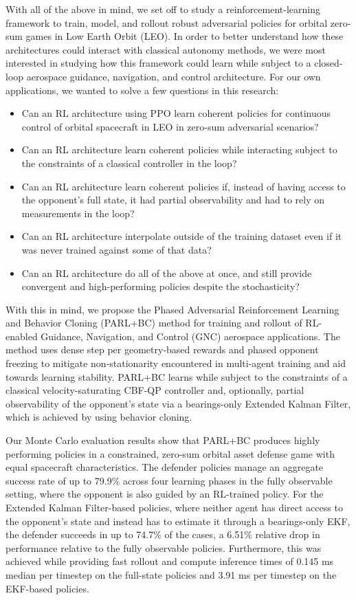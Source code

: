 With all of the above in mind, we set off to study a reinforcement-learning framework to train, model, and rollout robust adversarial policies for orbital zero-sum games in Low Earth Orbit (LEO). In order to better understand how these architectures could interact with classical autonomy methods, we were most interested in studying how this framework could learn while subject to a closed-loop aerospace guidance, navigation, and control architecture. For our own applications, we wanted to solve a few questions in this research:

\begin{itemize}
    \item Can an RL architecture using PPO learn coherent policies for continuous control of orbital spacecraft in LEO in zero-sum adversarial scenarios?
    \item Can an RL architecture learn coherent policies while interacting subject to the constraints of a classical controller in the loop?
    \item Can an RL architecture learn coherent policies if, instead of having access to the opponent's full state, it had partial observability and had to rely on measurements in the loop?
    \item Can an RL architecture interpolate outside of the training dataset even if it was never trained against some of that data?
    \item Can an RL architecture do all of the above at once, and still provide convergent and high-performing policies despite the stochasticity?
\end{itemize}


With this in mind, we propose the Phased Adversarial Reinforcement Learning and Behavior Cloning (PARL+BC) method for training and rollout of RL-enabled Guidance, Navigation, and Control (GNC) aerospace applications. The method uses dense step per geometry-based rewards and phased opponent freezing to mitigate non-stationarity encountered in multi-agent training and aid towards learning stability. PARL+BC learns while subject to the constraints of a classical velocity-saturating CBF-QP controller and, optionally, partial observability of the opponent's state via a bearings-only Extended Kalman Filter, which is achieved by using behavior cloning.



Our Monte Carlo evaluation results show that PARL+BC produces highly performing policies in a constrained, zero-sum orbital asset defense game with equal spacecraft characteristics. The defender policies manage an aggregate success rate of up to 79.9\% across four learning phases in the fully observable setting, where the opponent is also guided by an RL-trained policy. For the Extended Kalman Filter-based policies, where neither agent has direct access to the opponent's state and instead has to estimate it through a bearings-only EKF, the defender succeeds in up to 74.7\% of the cases, a 6.51\% relative drop in performance relative to the fully observable policies. Furthermore, this was achieved while providing fast rollout and compute inference times of 0.145 ms median per timestep on the full-state policies and 3.91 ms per timestep on the EKF-based policies.

